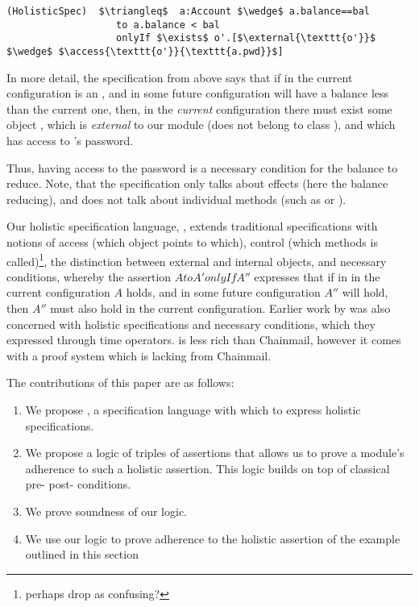  \begin{lstlisting}[language = Chainmail, mathescape=true, frame=lines]
(HolisticSpec)  $\triangleq$  a:Account $\wedge$ a.balance==bal
                   to a.balance < bal
                   onlyIf $\exists$ o'.[$\external{\texttt{o'}}$ $\wedge$ $\access{\texttt{o'}}{\texttt{a.pwd}}$]
\end{lstlisting}
 
 In more detail, the specification from above says that if in the current
 configuration  is an ,
 and in some future configuration  will have a balance less than the current one, then, in the \emph{current} configuration
 there must exist some object , which is \emph{external} to our module (does not belong to class
 ), and which has access to 's password.
 
 
 Thus, having access to the password is a necessary condition for the balance to reduce.
 Note, that the specification only talks about effects (here the balance reducing), and does not
 talk about individual methods (such as  or ).
 
 Our holistic specification language, \Chainmail, extends traditional specifications with
notions of access (which object points to which), control (which methods is called)\footnote{perhaps drop as confusing?}, 
 the distinction between external and internal objects, and necessary conditions, 
 whereby the assertion $A to A' onlyIf A''$ expresses that if in in the current configuration
 $A$ holds, and in some future configuration $A''$ will hold, then $A''$ must also hold in the 
 current configuration.  Earlier work by \cite{tacas} was also concerned with 
 holistic specifications and necessary conditions, which they expressed through time operators.
 \Chainmail is less rich than Chainmail, however it comes with a proof system which is lacking from 
 Chainmail.
 
  
 The contributions of this paper are as follows:
 
 \begin{enumerate}
 \item
 We propose \Chainmail, a specification language with which to
express holistic specifications. 
 \item
 We propose a logic of triples of assertions that allows us to prove
 a module's adherence to such a holistic assertion. 
 This logic builds on top of classical pre- post- conditions.
 \item
 We prove soundness of our logic.  
 \item
 We use our logic to prove adherence to the holistic assertion of the example
outlined  in this section
 \end{enumerate}
 
